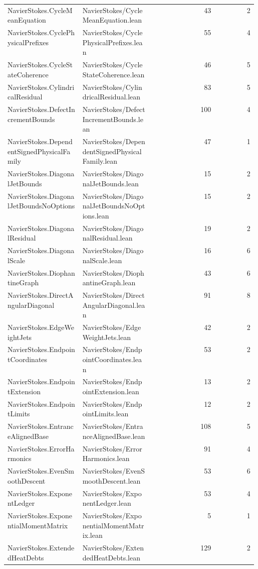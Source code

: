 \begin{longtable}{p{0.30\linewidth}p{0.28\linewidth}rr}
NavierStokes.CycleMeanEquation & NavierStokes/CycleMeanEquation.lean & 43 & 2\\
NavierStokes.CyclePhysicalPrefixes & NavierStokes/CyclePhysicalPrefixes.lean & 55 & 4\\
NavierStokes.CycleStateCoherence & NavierStokes/CycleStateCoherence.lean & 46 & 5\\
NavierStokes.CylindricalResidual & NavierStokes/CylindricalResidual.lean & 83 & 5\\
NavierStokes.DefectIncrementBounds & NavierStokes/DefectIncrementBounds.lean & 100 & 4\\
NavierStokes.DependentSignedPhysicalFamily & NavierStokes/DependentSignedPhysicalFamily.lean & 47 & 1\\
NavierStokes.DiagonalJetBounds & NavierStokes/DiagonalJetBounds.lean & 15 & 2\\
NavierStokes.DiagonalJetBoundsNoOptions & NavierStokes/DiagonalJetBoundsNoOptions.lean & 15 & 2\\
NavierStokes.DiagonalResidual & NavierStokes/DiagonalResidual.lean & 19 & 2\\
NavierStokes.DiagonalScale & NavierStokes/DiagonalScale.lean & 16 & 6\\
NavierStokes.DiophantineGraph & NavierStokes/DiophantineGraph.lean & 43 & 6\\
NavierStokes.DirectAngularDiagonal & NavierStokes/DirectAngularDiagonal.lean & 91 & 8\\
NavierStokes.EdgeWeightJets & NavierStokes/EdgeWeightJets.lean & 42 & 2\\
NavierStokes.EndpointCoordinates & NavierStokes/EndpointCoordinates.lean & 53 & 2\\
NavierStokes.EndpointExtension & NavierStokes/EndpointExtension.lean & 13 & 2\\
NavierStokes.EndpointLimits & NavierStokes/EndpointLimits.lean & 12 & 2\\
NavierStokes.EntranceAlignedBase & NavierStokes/EntranceAlignedBase.lean & 108 & 5\\
NavierStokes.ErrorHarmonics & NavierStokes/ErrorHarmonics.lean & 91 & 4\\
NavierStokes.EvenSmoothDescent & NavierStokes/EvenSmoothDescent.lean & 53 & 6\\
NavierStokes.ExponentLedger & NavierStokes/ExponentLedger.lean & 53 & 4\\
NavierStokes.ExponentialMomentMatrix & NavierStokes/ExponentialMomentMatrix.lean & 5 & 1\\
NavierStokes.ExtendedHeatDebts & NavierStokes/ExtendedHeatDebts.lean & 129 & 2\\

\end{longtable}
